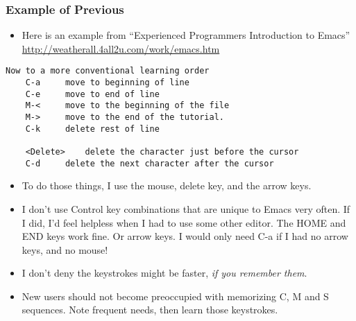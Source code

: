 \documentclass[11pt,english]{beamer}
\begin{document}
\begin{frame}
  \frametitle{Example of Previous}
  \begin{itemize}
  \item Here is an example from ``Experienced Programmers Introduction to
    Emacs'' \url{http://weatherall.4all2u.com/work/emacs.htm}
  \end{itemize}
  \begin{lstlisting}[basicstyle={\small},tabsize=2]
    Now to a more conventional learning order
    C-a 	move to beginning of line
    C-e 	move to end of line
    M-< 	move to the beginning of the file
    M-> 	move to the end of the tutorial.
    C-k 	delete rest of line
    
    <Delete> 	delete the character just before the cursor
    C-d 	delete the next character after the cursor
  \end{lstlisting}

  \begin{itemize}
  \item To do those things, I use the mouse, delete key, and the arrow keys. 
  \item I don't use Control key combinations that are unique to Emacs
    very often.  If I did, I'd feel helpless when I had to use some
    other editor. The HOME and END keys work fine.
    Or arrow keys. I would only need C-a if I had no arrow keys, and no
    mouse!
  \item I don't deny the keystrokes might be faster, \emph{if you remember them}. 
  \item New users should not become preoccupied
    with memorizing C, M and S sequences. Note frequent needs, then
    learn those keystrokes.
  \end{itemize}
\end{frame}
\end{document}
